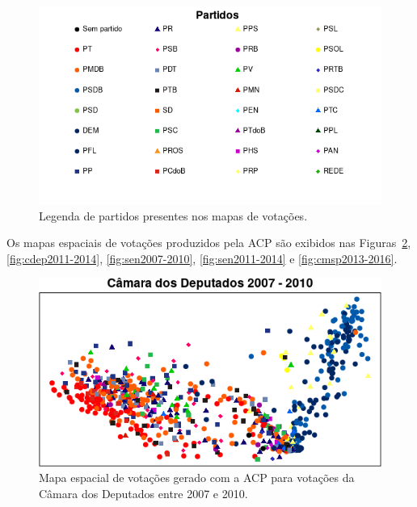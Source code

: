\documentclass[
	article,			%
	12pt,				%
	oneside,			%
	a4paper,			%
	english,			%
	brazil,				%
	sumario=tradicional,
	oldfontcommands %
	]{abntex2}
\begin{document}
\begin{figure}[h!]
  \centering
  \includegraphics[scale=0.8]{figs/partidos.png}
  \caption{Legenda de partidos presentes nos mapas de votações.}
  \label{fig:partidos}
\end{figure}

Os mapas espaciais de votações produzidos pela ACP são exibidos nas Figuras~\ref{fig:cdep2007-2010}, \ref{fig:cdep2011-2014}, \ref{fig:sen2007-2010}, \ref{fig:sen2011-2014} e \ref{fig:cmsp2013-2016}.

\begin{figure}[h!]
  \centering
  \includegraphics[scale=0.9]{figs/cdep2007-2010.png}
  \caption{Mapa espacial de votações gerado com a ACP para votações da Câmara dos Deputados entre 2007 e 2010.}
  \label{fig:cdep2007-2010}
\end{figure}
\end{document}
